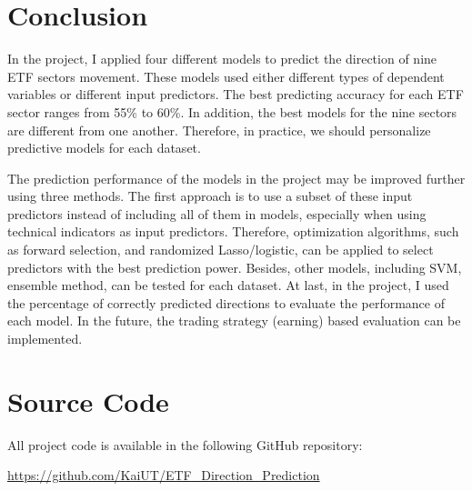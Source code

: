\documentclass[letterpaper]{article}
\begin{document}
\section{Conclusion}
In the project, I applied four different models to predict the direction of nine
ETF sectors movement. These models used either different types of dependent
variables or different input predictors. The best predicting accuracy for each
ETF sector ranges from 55\% to 60\%. In addition, the best models for the nine
sectors are different from one another. Therefore, in practice, we should
personalize predictive models for each dataset.

The prediction performance of the models in the project may be improved
further using three methods. The first approach is to use a subset of these
input predictors instead of including all of them in models, especially when
using technical indicators as input predictors. Therefore, optimization
algorithms, such as forward selection, and randomized Lasso/logistic, can be
applied to select predictors with the best prediction power. Besides, other
models, including SVM, ensemble method, can be tested for each dataset. At last, in
the project, I used the percentage of correctly predicted directions to
evaluate the performance of each model. In the future, the trading strategy
(earning) based evaluation can be implemented.

\section{Source Code}
All project code is available in the following GitHub repository:

\url{https://github.com/KaiUT/ETF_Direction_Prediction}



\end{document}
